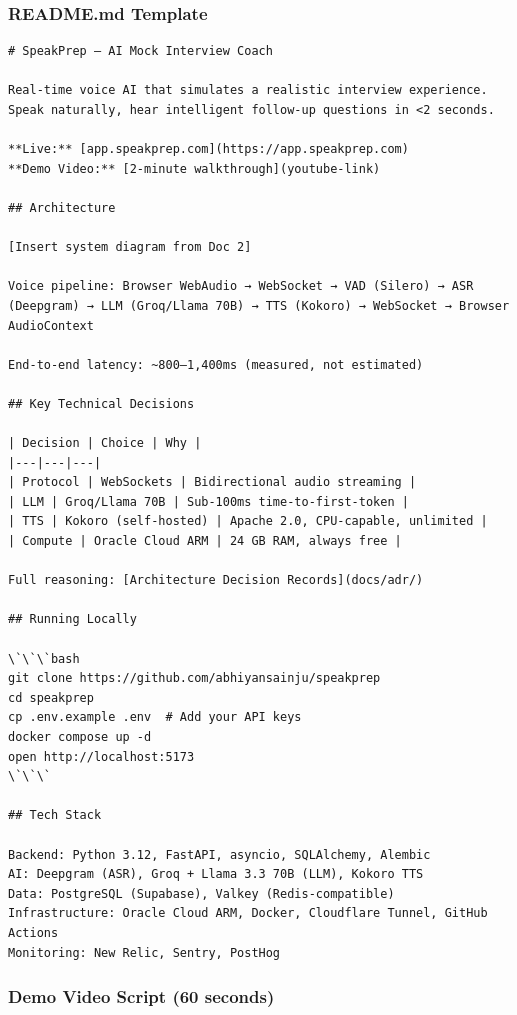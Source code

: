 \documentclass[
  11pt,
]{article}
\begin{document}
\hypertarget{readme.md-template}{%
\subsubsection{README.md Template}\label{readme.md-template}}

\begin{lstlisting}
# SpeakPrep — AI Mock Interview Coach

Real-time voice AI that simulates a realistic interview experience. 
Speak naturally, hear intelligent follow-up questions in <2 seconds.

**Live:** [app.speakprep.com](https://app.speakprep.com)
**Demo Video:** [2-minute walkthrough](youtube-link)

## Architecture

[Insert system diagram from Doc 2]

Voice pipeline: Browser WebAudio → WebSocket → VAD (Silero) → ASR (Deepgram) → LLM (Groq/Llama 70B) → TTS (Kokoro) → WebSocket → Browser AudioContext

End-to-end latency: ~800–1,400ms (measured, not estimated)

## Key Technical Decisions

| Decision | Choice | Why |
|---|---|---|
| Protocol | WebSockets | Bidirectional audio streaming |
| LLM | Groq/Llama 70B | Sub-100ms time-to-first-token |
| TTS | Kokoro (self-hosted) | Apache 2.0, CPU-capable, unlimited |
| Compute | Oracle Cloud ARM | 24 GB RAM, always free |

Full reasoning: [Architecture Decision Records](docs/adr/)

## Running Locally

\`\`\`bash
git clone https://github.com/abhiyansainju/speakprep
cd speakprep
cp .env.example .env  # Add your API keys
docker compose up -d
open http://localhost:5173
\`\`\`

## Tech Stack

Backend: Python 3.12, FastAPI, asyncio, SQLAlchemy, Alembic
AI: Deepgram (ASR), Groq + Llama 3.3 70B (LLM), Kokoro TTS
Data: PostgreSQL (Supabase), Valkey (Redis-compatible)
Infrastructure: Oracle Cloud ARM, Docker, Cloudflare Tunnel, GitHub Actions
Monitoring: New Relic, Sentry, PostHog
\end{lstlisting}

\hypertarget{demo-video-script-60-seconds}{%
\subsubsection{Demo Video Script (60
seconds)}\label{demo-video-script-60-seconds}}
\end{document}
